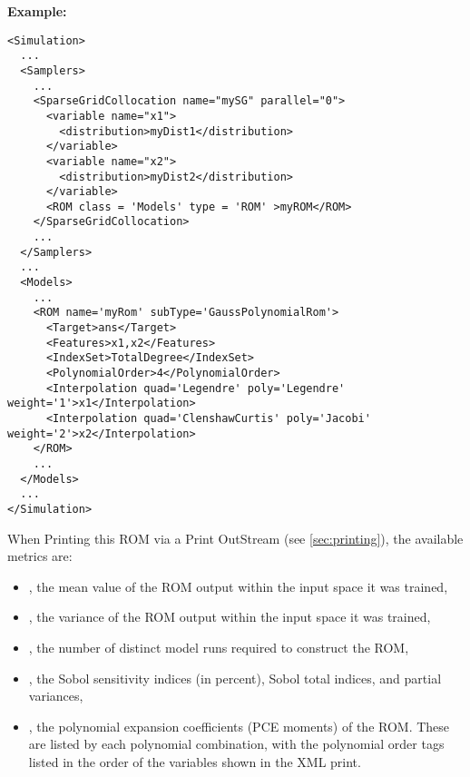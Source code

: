 
\textbf{Example:}
{\footnotesize
\begin{lstlisting}[style=XML,morekeywords={name,subType}]
<Simulation>
  ...
  <Samplers>
    ...
    <SparseGridCollocation name="mySG" parallel="0">
      <variable name="x1">
        <distribution>myDist1</distribution>
      </variable>
      <variable name="x2">
        <distribution>myDist2</distribution>
      </variable>
      <ROM class = 'Models' type = 'ROM' >myROM</ROM>
    </SparseGridCollocation>
    ...
  </Samplers>
  ...
  <Models>
    ...
    <ROM name='myRom' subType='GaussPolynomialRom'>
      <Target>ans</Target>
      <Features>x1,x2</Features>
      <IndexSet>TotalDegree</IndexSet>
      <PolynomialOrder>4</PolynomialOrder>
      <Interpolation quad='Legendre' poly='Legendre' weight='1'>x1</Interpolation>
      <Interpolation quad='ClenshawCurtis' poly='Jacobi' weight='2'>x2</Interpolation>
    </ROM>
    ...
  </Models>
  ...
</Simulation>
\end{lstlisting}
}

When Printing this ROM via a Print OutStream (see \ref{sec:printing}), the available metrics are:
\begin{itemize}
  \item {}, the mean value of the ROM output within the input space it was trained,
  \item {}, the variance of the ROM output within the input space it was trained,
  \item {}, the number of distinct model runs required to construct the ROM,
  \item {}, the Sobol sensitivity indices (in percent), Sobol total indices, and partial variances,
  \item {}, the polynomial expansion coefficients (PCE moments) of the ROM.  These are
    listed by each polynomial combination, with the polynomial order tags listed in the order of the variables
    shown in the XML print.
\end{itemize}

